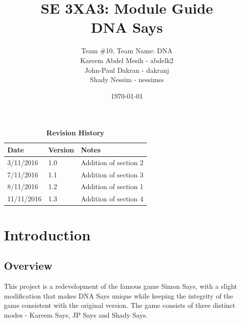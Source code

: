 \documentclass[12pt, titlepage]{article}
\title{SE 3XA3: Module Guide\\DNA Says}
\author{Team \#10, Team Name: DNA
		\\ Kareem Abdel Mesih - abdelk2
		\\ John-Paul Dakran - dakranj
		\\ Shady Nessim - nessimss
}
\date{\today}
\begin{document}
\maketitle

\tableofcontents
\listoftables
\listoffigures

\begin{table}[H]
\caption{\bf Revision History}
\begin{tabularx}{\textwidth}{p{3cm}p{2cm}X}
\toprule {\bf Date} & {\bf Version} & {\bf Notes}\\
\midrule
3/11/2016 & 1.0 & Addition of section 2\\
7/11/2016 & 1.1 & Addition of section 3\\
8/11/2016 & 1.2 & Addition of section 1\\
11/11/2016 & 1.3 & Addition of section 4\\
\bottomrule
\end{tabularx}
\end{table}

\newpage


\section{Introduction}

\subsection{Overview}
\par This project is a redevelopment of the famous game Simon Says, with a slight modification that makes DNA Says unique while keeping the integrity of the game consistent with the original version. The game consists of three distinct modes - Kareem Says, JP Says and Shady Says.
\end{document}
